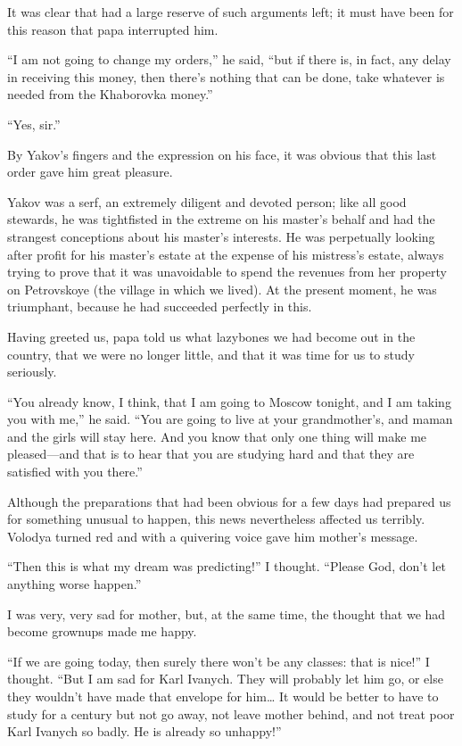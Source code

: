 It was clear that had a large reserve of such arguments left; it must have been for this reason that papa interrupted him.

``I am not going to change my orders,'' he said, ``but if there is, in fact, any delay in receiving this money, then there's nothing that can be done, take whatever is needed from the Khaborovka money.'' %

``Yes, sir.'' %

By Yakov's fingers and the expression on his face, it was obvious that this last order gave him great pleasure.

Yakov was a serf, an extremely diligent and devoted person; like all good stewards, he was tightfisted in the extreme on his master's behalf and had the strangest conceptions about his master's interests. He was perpetually looking after profit for his master's estate at the expense of his mistress's estate, always trying to prove that it was unavoidable to spend the revenues from her property on Petrovskoye (the village in which we lived). At the present moment, he was triumphant, because he had succeeded perfectly in this.

Having greeted us, papa told us what lazybones we had become out in the country, that we were no longer little, and that it was time for us to study seriously.

``You already know, I think, that I am going to Moscow tonight, and I am taking you with me,'' he said. ``You are going to live at your grandmother's, and maman and the girls will stay here. And you know that only one thing will make me pleased---and that is to hear that you are studying hard and that they are satisfied with you there.'' %

Although the preparations that had been obvious for a few days had prepared us for something unusual to happen, this news nevertheless affected us terribly. Volodya turned red and with a quivering voice gave him mother's message.

``Then this is what my dream was predicting!'' I thought. ``Please God, don't let anything worse happen.'' %

I was very, very sad for mother, but, at the same time, the thought that we had become grownups made me happy.

``If we are going today, then surely there won't be any classes: that is nice!'' I thought. ``But I am sad for Karl Ivanych. They will probably let him go, or else they wouldn't have made that envelope for him\ldots{} It would be better to have to study for a century but not go away, not leave mother behind, and not treat poor Karl Ivanych so badly. He is already so unhappy!'' %


